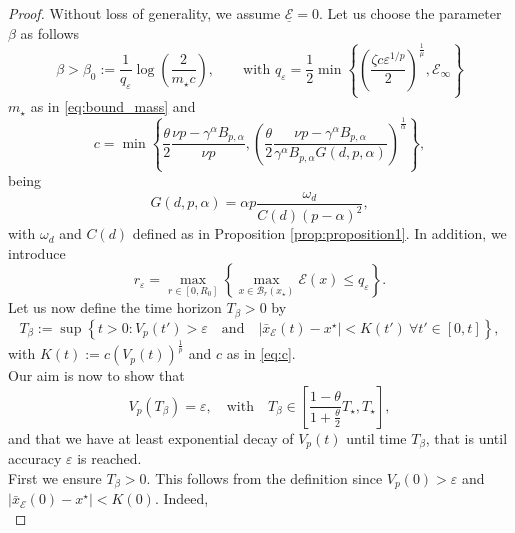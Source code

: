 \documentclass[11pt,handout]{article}%
\numberwithin{equation}{section}
\theoremstyle{definition}
\begin{document}
\begin{proof}
	Without loss of generality, we assume $\underline{\mathcal{E}}=0$. Let us choose the parameter $\beta$ as follows 
	\begin{equation}\label{eq:beta}
		\beta > \beta_0 := \frac{1}{q_\varepsilon} \log\left( \frac{2}{ m_\star c}\right), \qquad \text{with } 	q_\varepsilon = \frac{1}{2} \min \left\lbrace \left( \frac{\zeta c \varepsilon^{1/p}}{2} \right)^{\frac{1}{\mu}}, \mathcal{E}_\infty \right\rbrace 
	\end{equation}
	$m_\star$ as in \eqref{eq:bound_mass} 
	and 
	\begin{equation}\label{eq:c}
		c = \min \left\lbrace \frac{\theta}{2} \frac{\nu p -\gamma^\alpha B_{p,\alpha}}{\nu p},\left( \frac{\theta}{2} \frac{\nu p -\gamma^\alpha B_{p,\alpha}}{\gamma^\alpha B_{p,\alpha}G(d,p,\alpha) }\right)^{\frac{1}{\alpha}}\right\rbrace, 
	\end{equation}
	being 
	\begin{equation}\label{eq:G}
		G(d,p,\alpha) = \alpha p \frac{\omega_d}{C(d)(p-\alpha)^2},
	\end{equation}
	with $\omega_d$ and $C(d)$ defined as in Proposition \ref{prop:proposition1}. In addition, we introduce 
	\begin{equation}
		r_\varepsilon = \max_{r\in[0,R_0]} \left\lbrace \max_{x\in \mathcal{B}_r(x_\star)} \mathcal{E}(x) \leq q_\varepsilon \right\rbrace. 
	\end{equation}
	Let us now define the time horizon $T_\beta>0$ by 
	\begin{equation}
		T_\beta :=\sup \left\lbrace  t>0 : V_p(t')>\varepsilon \quad \text{and} \quad  \vert \bar{x}_\mathcal{E}(t)-x^\star \vert < K(t')~ \forall t'\in [0,t]\right\rbrace, 
	\end{equation}
	with $K(t) := c (V_p(t))^{\frac{1}{p}}$ and $c$ as in \eqref{eq:c}. \\
	Our aim is now to show that 
	\begin{equation}\label{eq:proof_goal}
		V_p(T_\beta) = \varepsilon, \quad \text{with} \quad T_\beta \in \left[ \frac{1-\theta}{1+\frac{\theta}{2}} T_\star, T_\star \right],
	\end{equation}
	and that we have at least exponential decay of $V_p(t)$ until time $T_\beta$, that is until accuracy $\varepsilon$ is reached. \\
	First we ensure $T_\beta>0$. This follows from the definition since $V_p(0)>\varepsilon$  and $\vert \bar{x}_\mathcal{E}(0)-x^\star \vert < K(0)$. Indeed,
	\begin{equation*}

\end{equation*}
\end{proof}
\end{document}
